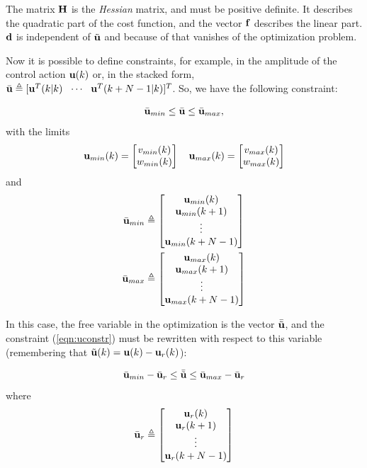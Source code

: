 \documentclass[conference]{IEEEtran} %
\begin{document}
The matrix ${\bf H}$ is the {\em Hessian} matrix, and must be positive definite. It describes the quadratic part of the cost function, and the vector ${\bf f}$ describes the linear part. $\bf d$ is independent of $\tilde{\bf u}$ and because of that vanishes of the optimization problem.

Now it is possible to define constraints, for example, in the amplitude of
the control action ${\bf u}(k)$ or, in the stacked form, $\bar {\bf
u}\triangleq[{\bf u}^T(k|k)~~\cdots~~{\bf u}^T(k+N-1|k)]^T$. So, we have the
following constraint:

\begin{equation}\label{eqn:uconstr}
	\bar{\bf u}_{min} \leq \bar{\bf u} \leq \bar{\bf u}_{max},
\end{equation}
with the limits 
\begin{equation*}
	{\bf u}_{min}(k) = \begin{bmatrix}
		v_{min}(k) \\ w_{min}(k)
	\end{bmatrix} \quad 
	{\bf u}_{max}(k) = \begin{bmatrix}
		v_{max}(k) \\ w_{max}(k)
	\end{bmatrix}
\end{equation*}
\noindent and
\begin{align*}
	\bar{\bf u}_{min} &\triangleq \begin{bmatrix}
		{\bf u}_{min}(k) \\ {\bf u}_{min}(k+1) \\ \vdots \\ {\bf u}_{min}(k+N-1)
	\end{bmatrix} \\
	\bar{\bf u}_{max} &\triangleq \begin{bmatrix}
		{\bf u}_{max}(k) \\ {\bf u}_{max}(k+1) \\ \vdots \\ {\bf u}_{max}(k+N-1)
	\end{bmatrix}
\end{align*}

In this case, the free variable in the optimization is the vector
$\bar{\tilde{\bf u}}$, and the constraint (\ref{eqn:uconstr}) must be
rewritten with respect to this variable (remembering that $\tilde{\bf
u}(k)={\bf u}(k)-{\bf u}_r(k)$):

\begin{equation*}
	\bar{\bf u}_{min} - \bar{\bf u}_r \leq {\bar{\tilde{\bf u}}} \leq \bar{\bf u}_{max} - \bar{\bf u}_r
\end{equation*}
where
\begin{equation*}
	\bar{\bf u}_r \triangleq \begin{bmatrix}
		{\bf u}_r(k) \\ {\bf u}_r(k+1) \\ \vdots \\ {\bf u}_r(k+N-1)
	\end{bmatrix}
\end{equation*}
\end{document}
